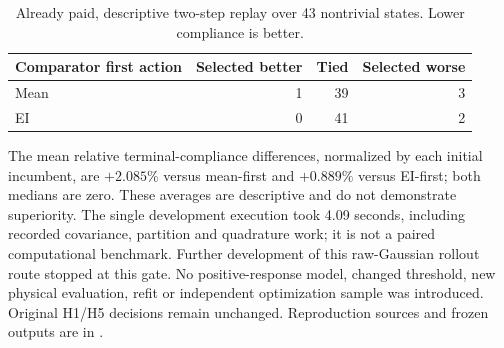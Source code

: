 \begin{table}[htbp]\centering\small
\caption{Already paid, descriptive two-step replay over 43 nontrivial states. Lower compliance is better.}\label{tab:direct_rollout_replay}
\begin{tabular}{lrrr}\toprule
Comparator first action & Selected better & Tied & Selected worse\\\midrule
Mean & 1 & 39 & 3\\
EI & 0 & 41 & 2\\\bottomrule
\end{tabular}\end{table}

The mean relative terminal-compliance differences, normalized by each initial incumbent, are $+2.085\%$ versus mean-first and $+0.889\%$ versus EI-first; both medians are zero. These averages are descriptive and do not demonstrate superiority. The single development execution took 4.09 seconds, including recorded covariance, partition and quadrature work; it is not a paired computational benchmark. Further development of this raw-Gaussian rollout route stopped at this gate. No positive-response model, changed threshold, new physical evaluation, refit or independent optimization sample was introduced. Original H1/H5 decisions remain unchanged. Reproduction sources and frozen outputs are in .
